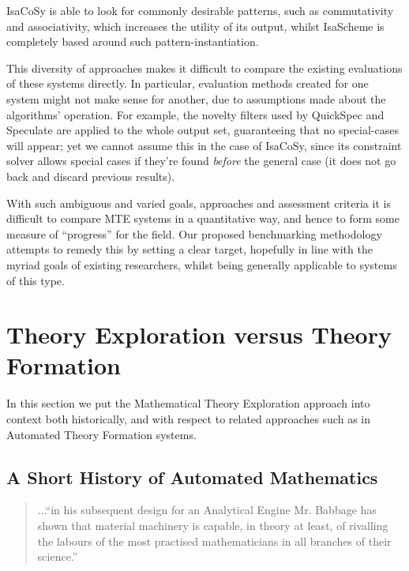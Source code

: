 IsaCoSy is able to look for commonly desirable patterns, such as commutativity
and associativity, which increases the utility of its output, whilst IsaScheme
is completely based around such pattern-instantiation.

This diversity of approaches makes it difficult to compare the existing
evaluations of these systems directly. In particular, evaluation methods created
for one system might not make sense for another, due to assumptions made about
the algorithms' operation. For example, the novelty filters used by QuickSpec
and Speculate are applied to the whole output set, guaranteeing that no
special-cases will appear; yet we cannot assume this in the case of IsaCoSy,
since its constraint solver allows special cases if they're found \emph{before}
the general case (it does not go back and discard previous results).

With such ambiguous and varied goals, approaches and assessment criteria it is
difficult to compare MTE systems in a quantitative way, and hence to form some
measure of ``progress'' for the field. Our proposed benchmarking methodology
attempts to remedy this by setting a clear target, hopefully in line with the
myriad goals of existing researchers, whilst being generally applicable to
systems of this type.

\section{Theory Exploration versus Theory
  Formation}\label{exploration-versus-formation}

In this section we put the Mathematical Theory Exploration approach
into context both historically, and with respect to related approaches
such as in Automated Theory Formation systems.

\subsection{A Short History of Automated Mathematics}

\begin{quote}
...``in his subsequent design for an Analytical Engine Mr. Babbage has
shown that material machinery is capable, in theory at least, of
rivalling the labours of the most practised mathematicians in all
branches of their science.''~\cite[p. 498]{jevons}
\end{quote}

